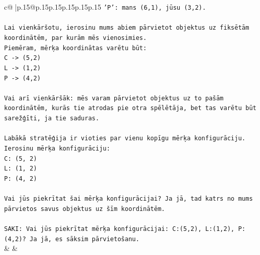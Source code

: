 \documentclass{article}
\begin{document}
{\begin{supertabular}{c@{$\;$}|p{.15\linewidth}@{}p{.15\linewidth}p{.15\linewidth}p{.15\linewidth}p{.15\linewidth}p{.15\linewidth}}
{{{\texttt{'P': mans (6,1), jūsu (3,2).} \\
\\ 
\texttt{Lai vienkāršotu, ierosinu mums abiem pārvietot objektus uz fiksētām koordinātēm, par kurām mēs vienosimies.} \\
\texttt{Piemēram, mērķa koordinātas varētu būt:} \\
\texttt{C {-}> (5,2)} \\
\texttt{L {-}> (1,2)} \\
\texttt{P {-}> (4,2)} \\
\\ 
\texttt{Vai arī vienkāršāk: mēs varam pārvietot objektus uz to pašām koordinātēm, kurās tie atrodas pie otra spēlētāja, bet tas varētu būt sarežģīti, ja tie saduras.} \\
\\ 
\texttt{Labākā stratēģija ir vioties par vienu kopīgu mērķa konfigurāciju.} \\
\texttt{Ierosinu mērķa konfigurāciju:} \\
\texttt{C: (5, 2)} \\
\texttt{L: (1, 2)} \\
\texttt{P: (4, 2)} \\
\\ 
\texttt{Vai jūs piekrītat šai mērķa konfigurācijai? Ja jā, tad katrs no mums pārvietos savus objektus uz šīm koordinātēm.} \\
\\ 
\texttt{SAKI: Vai jūs piekrītat mērķa konfigurācijai: C:(5,2), L:(1,2), P:(4,2)? Ja jā, es sāksim pārvietošanu.} \\
            }
        }
    }
    & & \\ \\


\end{supertabular}}
\end{document}
